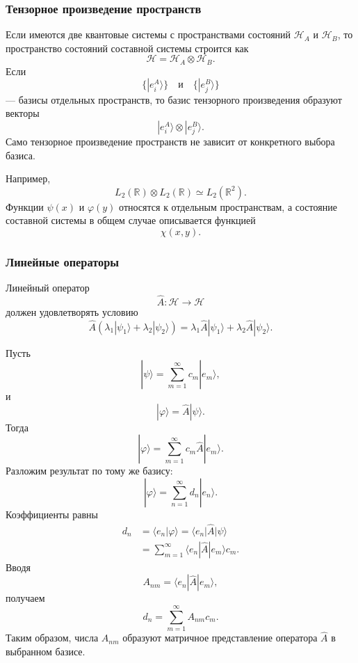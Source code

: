 \documentclass[12pt,a4paper]{article}
\begin{document}
\subsubsection{Тензорное произведение пространств}

Если имеются две квантовые системы с пространствами состояний
$\mathcal H_A$ и $\mathcal H_B$, то пространство состояний составной
системы строится как
\[
    \boxed{
        \mathcal H
        =
        \mathcal H_A\otimes\mathcal H_B
    }.
\]
Если
\[
    \{|e_i^A\rangle\}
    \quad\text{и}\quad
    \{|e_j^B\rangle\}
\]
--- базисы отдельных пространств, то базис тензорного произведения
образуют векторы
\[
    \boxed{
        |e_i^A\rangle\otimes|e_j^B\rangle
    }.
\]
Само тензорное произведение пространств не зависит от конкретного
выбора базиса.

Например,
\[
    \boxed{
        L_2(\mathbb R)\otimes L_2(\mathbb R)
        \simeq
        L_2(\mathbb R^2)
    }.
\]
Функции $\psi(x)$ и $\varphi(y)$ относятся к отдельным пространствам,
а состояние составной системы в общем случае описывается функцией
\[
    \chi(x,y).
\]


\subsubsection{Линейные операторы}

Линейный оператор
\[
    \hat A:\mathcal H\to\mathcal H
\]
должен удовлетворять условию
\[
\boxed{
\hat A
\left(
    \lambda_1|\psi_1\rangle+
    \lambda_2|\psi_2\rangle
\right)
=
\lambda_1\hat A|\psi_1\rangle+
\lambda_2\hat A|\psi_2\rangle
}.
\]

Пусть
\[
    |\psi\rangle
    =
    \sum_{m=1}^{\infty}c_m|e_m\rangle,
\]
и
\[
    |\varphi\rangle
    =
    \hat A|\psi\rangle.
\]
Тогда
\[
    |\varphi\rangle
    =
    \sum_{m=1}^{\infty}
        c_m\hat A|e_m\rangle.
\]
Разложим результат по тому же базису:
\[
    |\varphi\rangle
    =
    \sum_{n=1}^{\infty}
        d_n|e_n\rangle.
\]
Коэффициенты равны
\[
\begin{aligned}
    d_n
    &=
    \langle e_n|\varphi\rangle
    =
    \langle e_n|\hat A|\psi\rangle \\
    &=
    \sum_{m=1}^{\infty}
    \langle e_n|\hat A|e_m\rangle c_m.
\end{aligned}
\]
Вводя
\[
    \boxed{
        A_{nm}
        =
        \langle e_n|\hat A|e_m\rangle
    },
\]
получаем
\[
    \boxed{
        d_n
        =
        \sum_{m=1}^{\infty}A_{nm}c_m
    }.
\]
Таким образом, числа $A_{nm}$ образуют матричное представление
оператора $\hat A$ в выбранном базисе.
\end{document}
